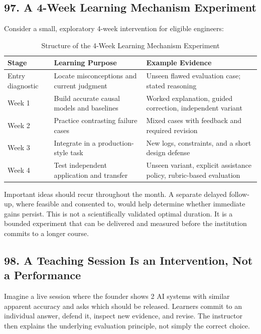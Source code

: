 \subsection*{97. A 4-Week Learning Mechanism Experiment}

Consider a small, exploratory 4-week intervention for eligible engineers:

\begin{table}[t]
\centering
\small
\caption{Structure of the 4-Week Learning Mechanism Experiment}
\begin{tabularx}{\textwidth}{p{}p{}X}
\toprule
\textbf{Stage} & \textbf{Learning Purpose} & \textbf{Example Evidence} \\
\midrule
Entry diagnostic & Locate misconceptions and current judgment & Unseen flawed evaluation case; stated reasoning \\
Week 1 & Build accurate causal models and baselines & Worked explanation, guided correction, independent variant \\
Week 2 & Practice contrasting failure cases & Mixed cases with feedback and required revision \\
Week 3 & Integrate in a production-style task & New logs, constraints, and a short design defense \\
Week 4 & Test independent application and transfer & Unseen variant, explicit assistance policy, rubric-based evaluation \\
\bottomrule
\end{tabularx}
\end{table}

Important ideas should recur throughout the month. A separate delayed follow-up, where feasible and consented to, would help determine whether immediate gains persist. This is not a scientifically validated optimal duration. It is a bounded experiment that can be delivered and measured before the institution commits to a longer course.

\subsection*{98. A Teaching Session Is an Intervention, Not a Performance}

Imagine a live session where the founder shows 2 AI systems with similar apparent accuracy and asks which should be released. Learners commit to an individual answer, defend it, inspect new evidence, and revise. The instructor then explains the underlying evaluation principle, not simply the correct choice.

